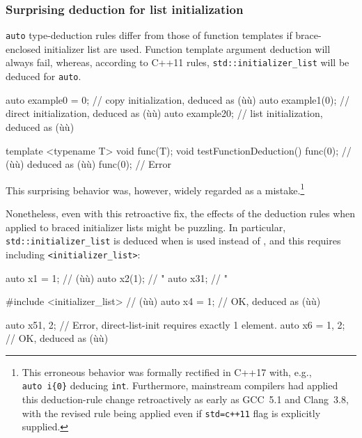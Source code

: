 \subsubsection[Surprising deduction for list initialization]{Surprising deduction for list initialization}\label{surprising-deduction-for-list-initialization}

\lstinline!auto! type-deduction rules differ from those of function
templates if brace-enclosed initializer list are used. Function template
argument deduction will always fail, whereas, according to C++11 rules,
\lstinline!std::initializer_list! will be deduced for \lstinline!auto!.

\begin{emcppslisting}
auto example0 = 0; // copy initialization, deduced as (ù{}ù)
auto example1(0);  // direct initialization, deduced as (ù{}ù)
auto example2{0};  // list initialization, deduced as (ù{}ù)

template <typename T> void func(T);
void testFunctionDeduction()
{
    func(0);    // (ù{}ù) deduced as (ù{}ù)
    func({0});  // Error
}
\end{emcppslisting}

\noindent This surprising behavior was, however, widely regarded as a mistake.\footnote{This erroneous behavior was formally rectified in C++17 with, e.g., \lstinline!auto!~\lstinline!i{0}!
deducing \lstinline!int!. Furthermore, mainstream compilers had applied
this deduction-rule change retroactively as early as GCC~5.1 and Clang~3.8, with the revised rule being applied even if \lstinline!std=c++11!
flag is explicitly supplied.}

Nonetheless, even with this retroactive fix, the effects of the
deduction rules when applied to braced initializer lists might be
puzzling. In particular, \lstinline!std::initializer_list! is deduced when
 is used instead of
, and this requires including \lstinline!<initializer_list>!:

\begin{emcppslisting}
auto x1 = 1;                 // (ù{}ù)
auto x2(1);                  //  "
auto x3{1};                  //  "

#include <initializer_list>  // (ù{}ù)
auto x4 = {1};               // OK, deduced as (ù{}ù)

auto x5{1, 2};               // Error, direct-list-init requires exactly 1 element.
auto x6 = {1, 2};            // OK, deduced as (ù{}ù)
\end{emcppslisting}


